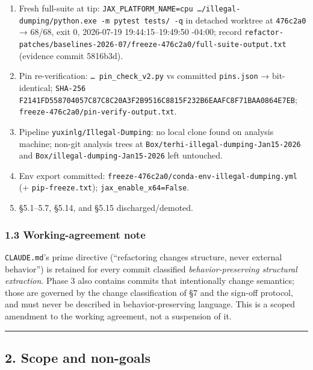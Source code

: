 \documentclass[
  10pt,
]{article}
\providecommand{\tightlist}{%
  \setlength{\itemsep}{0pt}\setlength{\parskip}{0pt}}
\begin{document}
\begin{enumerate}
\def\labelenumi{\arabic{enumi}.}
\tightlist
\item
  Fresh full-suite at tip: \texttt{JAX\_PLATFORM\_NAME=cpu …/illegal-dumping/python.exe -m pytest tests/ -q} in detached worktree at \texttt{476c2a0} → 68/68, exit 0, 2026-07-19 19:44:15–19:49:50 -04:00; record \texttt{refactor-patches/baselines-2026-07/freeze-476c2a0/full-suite-output.txt} (evidence commit 5816b3d).
\item
  Pin re-verification: \texttt{… pin\_check\_v2.py} vs committed \texttt{pins.json} → bit-identical; \texttt{SHA-256 F2141FD558704057C87C8C20A3F2B9516C8815F232B6EAAFC8F71BAA0864E7EB}; \texttt{freeze-476c2a0/pin-verify-output.txt}.
\item
  Pipeline \texttt{yuxinlg/Illegal-Dumping}: no local clone found on analysis machine; non-git analysis trees at \texttt{Box/terhi-illegal-dumping-Jan15-2026} and \texttt{Box/illegal-dumping-Jan15-2026} left untouched.
\item
  Env export committed: \texttt{freeze-476c2a0/conda-env-illegal-dumping.yml} (+ \texttt{pip-freeze.txt}); \texttt{jax\_enable\_x64=False}.
\item
  §5.1–5.7, §5.14, and §5.15 discharged/demoted.
\end{enumerate}

\hypertarget{working-agreement-note}{%
\subsubsection{1.3 Working-agreement note}\label{working-agreement-note}}

\texttt{CLAUDE.md}'s prime directive (``refactoring changes structure, never external behavior'') is retained for every commit classified \emph{behavior-preserving structural extraction}. Phase 3 also contains commits that intentionally change semantics; those are governed by the change classification of §7 and the sign-off protocol, and must never be described in behavior-preserving language. This is a scoped amendment to the working agreement, not a suspension of it.

\begin{center}\rule{0.5\linewidth}{0.5pt}\end{center}

\hypertarget{scope-and-non-goals}{%
\subsection{2. Scope and non-goals}\label{scope-and-non-goals}}
\end{document}
